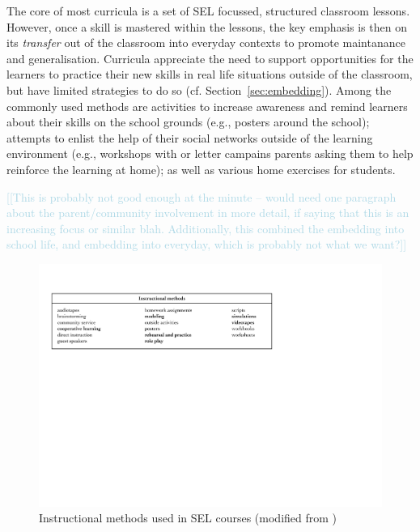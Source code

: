 \documentclass[prodmode,acmtochi]{acmsmall}
\newcommand{\todo}[1]{\textrm{\textrm{\textcolor{LightBlue}{[[#1]]} } } }
\begin{document}
The core of most curricula is a set of SEL focussed, structured classroom lessons. However, once a skill is mastered within the lessons, the key emphasis is then on its \emph{transfer} out of the classroom into everyday contexts to promote maintanance and generalisation. Curricula appreciate the need to support opportunities for the learners to practice their new skills in real life situations outside of the classroom, but have limited strategies to do so (cf. Section~\ref{sec:embedding}). Among the commonly used methods are activities to increase awareness and remind learners about their skills on the school grounds (e.g., posters around the school); attempts to enlist the help of their social networks outside of the learning environment (e.g., workshops with or letter campains parents asking them to help reinforce the learning at home); as well as various home exercises for students.

\todo{This is probably not good enough at the minute -- would need one paragraph about the parent/community involvement in more detail, if saying that this is an increasing focus or similar blah. Additionally, this combined the embedding into school life, and embedding into everyday, which is probably not what we want?}

\begin{figure}
  \centering
	\includegraphics[width=.98\textwidth]{images/Elias-MethodsList}
	\caption{Instructional methods used in SEL courses (modified from \cite[p.109]{Elias1997})}
	\label{fig:methods}
\end{figure}
\end{document}
